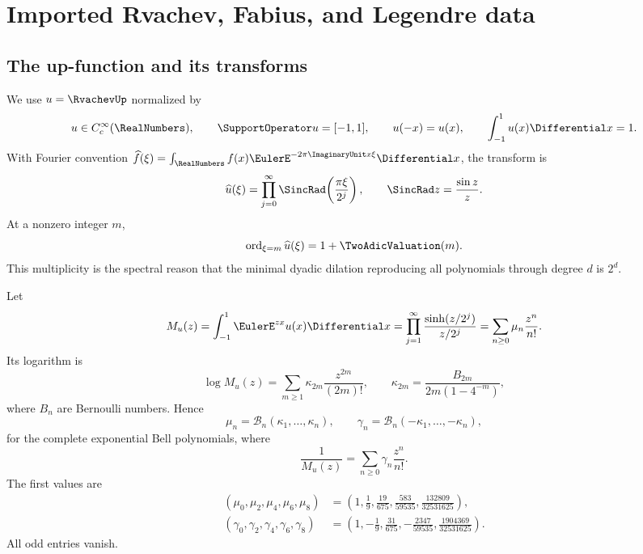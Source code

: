 \documentclass[11pt,oneside]{article}
\theoremstyle{definition}
\theoremstyle{remark}
\newcommand{\Bell}{\mathcal B}
\begin{document}
\section{Imported Rvachev, Fabius, and Legendre data}

\subsection{The up-function and its transforms}
We use $u=\RvachevUp$ normalized by
\begin{equation}
 u\in C_c^\infty(\RealNumbers),\qquad
 \SupportOperator u=[-1,1],\qquad u(-x)=u(x),\qquad
 \int_{-1}^{1}u(x)\Differential x=1.
 \label{eq:up-basic}
\end{equation}
With Fourier convention
$\widehat f(\xi)=\int_\RealNumbers f(x)\EulerE^{-2\pi\ImaginaryUnit x\xi}\Differential x$, the transform is
\begin{equation}
 \widehat u(\xi)=\prod_{j=0}^{\infty}
 \SincRad\!\left(\frac{\pi\xi}{2^j}\right),
 \qquad \SincRad z=\frac{\sin z}{z}.
 \label{eq:sinc-product}
\end{equation}
At a nonzero integer $m$,
\begin{equation}
 \operatorname{ord}_{\xi=m}\widehat u(\xi)=1+\TwoAdicValuation(m).
 \label{eq:zero-multiplicity}
\end{equation}
This multiplicity is the spectral reason that the minimal dyadic dilation
reproducing all polynomials through degree $d$ is $2^d$.

Let
\begin{equation}
 M_u(z)=\int_{-1}^{1}\EulerE^{zx}u(x)\Differential x
 =\prod_{j=1}^{\infty}\frac{\sinh(z/2^j)}{z/2^j}
 =\sum_{n\ge0}\mu_n\frac{z^n}{n!}.
 \label{eq:mgf}
\end{equation}
Its logarithm is
\begin{equation}
 \log M_u(z)=\sum_{m\ge1}\kappa_{2m}\frac{z^{2m}}{(2m)!},
 \qquad
 \boxed{\kappa_{2m}=\frac{B_{2m}}{2m(1-4^{-m})}},
 \label{eq:cumulants}
\end{equation}
where $B_n$ are Bernoulli numbers.  Hence
\begin{equation}
 \mu_n=\Bell_n(\kappa_1,\ldots,\kappa_n),
 \qquad
 \gamma_n=\Bell_n(-\kappa_1,\ldots,-\kappa_n),
 \label{eq:bell-moments}
\end{equation}
for the complete exponential Bell polynomials, where
\begin{equation}
 \frac1{M_u(z)}=\sum_{n\ge0}\gamma_n\frac{z^n}{n!}.
 \label{eq:reciprocal-moments}
\end{equation}
The first values are
\begin{align}
 (\mu_0,\mu_2,\mu_4,\mu_6,\mu_8)
 &=\left(1,\frac19,\frac{19}{675},\frac{583}{59535},
 \frac{132809}{32531625}\right),
 \label{eq:first-moments}\\
 (\gamma_0,\gamma_2,\gamma_4,\gamma_6,\gamma_8)
 &=\left(1,-\frac19,\frac{31}{675},-\frac{2347}{59535},
 \frac{1904369}{32531625}\right).
 \label{eq:first-gamma}
\end{align}
All odd entries vanish.
\end{document}
